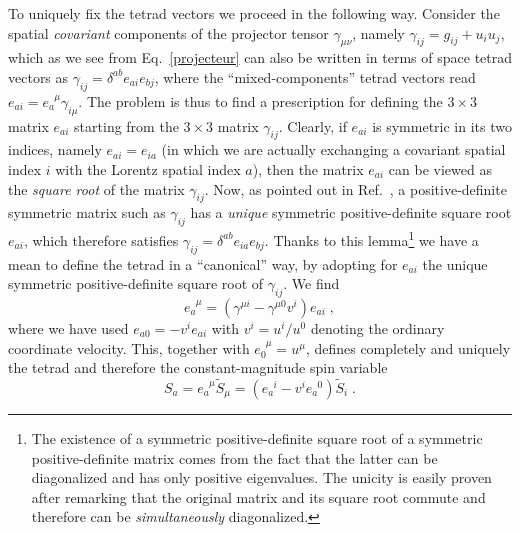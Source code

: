 \documentclass[
superscriptaddress,
preprint,
prd,tightenlines,showpacs,nofootinbib,
eqsecnum,
amsfonts,amsmath,amssymb]{revtex4-1}
\begin{document}
To uniquely fix the tetrad vectors we proceed in the following
way. Consider the spatial \textit{covariant} components of the
projector tensor $\gamma_{\mu\nu}$, namely $\gamma_{ij} = g_{ij} + u_i
u_j$, which as we see from Eq.~\eqref{projecteur} can also be written
in terms of space tetrad vectors as
$\gamma_{ij}=\delta^{ab}e_{ai}e_{bj}$, where the ``mixed-components''
tetrad vectors read $e_{ai}=e_a^{\phantom{a}\mu}\gamma_{i\mu}$. The
problem is thus to find a prescription for defining the $3\times
  3$ matrix $e_{ai}$ starting from the $3\times 3$ matrix
$\gamma_{ij}$. Clearly, if $e_{ai}$ is symmetric in its two indices,
namely $e_{ai}=e_{ia}$ (in which we are actually exchanging a
covariant spatial index $i$ with the Lorentz spatial index $a$), then
the matrix $e_{ai}$ can be viewed as the \textit{square root} of the
matrix $\gamma_{ij}$. Now, as pointed out in Ref.~\cite{Damour2008a},
a positive-definite symmetric matrix such as $\gamma_{ij}$ has a
\emph{unique} symmetric positive-definite square root $e_{ai}$, which
therefore satisfies $\gamma_{ij}=\delta^{ab}e_{ia}e_{bj}$. Thanks to
this
lemma\footnote{The existence of a symmetric positive-definite square
  root of a symmetric positive-definite matrix comes from the fact
  that the latter can be diagonalized and has only positive
  eigenvalues. The unicity is easily proven after remarking that the
  original matrix and its square root commute and therefore can be
  \textit{simultaneously} diagonalized.}  we have a mean to
define the tetrad in a ``canonical'' way, by adopting for $e_{ai}$ the
unique symmetric positive-definite square root of $\gamma_{ij}$. We
find
%
\begin{equation}\label{tetrad}
	e_a^{\phantom{a}\mu} = \left(\gamma^{\mu i}-\gamma^{\mu 0}v^i\right)e_{ai}  \; ,
\end{equation}
% 
where we have used $e_{a0}=-v^ie_{ai}$ with $v^i=u^i/u^0$ denoting the
ordinary coordinate velocity. This, together with
$e_0^{\phantom{0}\mu}=u^\mu$, defines completely and uniquely the
tetrad and therefore the constant-magnitude spin variable
%
\begin{equation}\label{constantspin}
  S_a = e_a^{\phantom{a}\mu} \tilde{S}_{\mu} = \left(e_a^{\phantom{a}i} 
    - v^i e_a^{\phantom{a}0}\right) \tilde{S}_{i}\; .
\end{equation}
%
\end{document}
